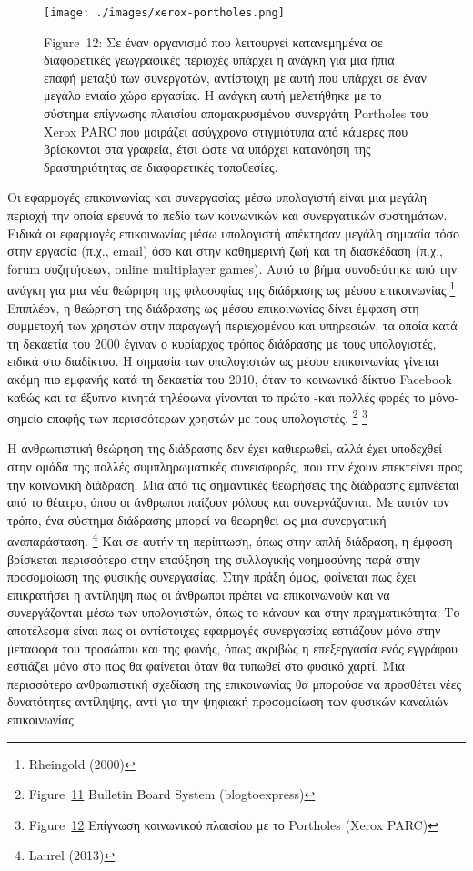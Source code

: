 \documentclass[
]{article}
\begin{document}
\leavevmode{}%
\begin{figure}
\hypertarget{fig:xerox-portholes}{%
\centering
\texttt{[image: ./images/xerox-portholes.png]}
\caption{Figure~12: Σε έναν οργανισμό που λειτουργεί κατανεμημένα σε
διαφορετικές γεωγραφικές περιοχές υπάρχει η ανάγκη για μια ήπια επαφή
μεταξύ των συνεργατών, αντίστοιχη με αυτή που υπάρχει σε έναν μεγάλο
ενιαίο χώρο εργασίας. Η ανάγκη αυτή μελετήθηκε με το σύστημα επίγνωσης
πλαισίου απομακρυσμένου συνεργάτη Portholes του Xerox PARC που μοιράζει
ασύγχρονα στιγμιότυπα από κάμερες που βρίσκονται στα γραφεία, έτσι ώστε
να υπάρχει κατανόηση της δραστηριότητας σε διαφορετικές
τοποθεσίες.}\label{fig:xerox-portholes}
}
\end{figure}

Οι εφαρμογές επικοινωνίας και συνεργασίας μέσω υπολογιστή είναι μια
μεγάλη περιοχή την οποία ερευνά το πεδίο των κοινωνικών και συνεργατικών
συστημάτων. Ειδικά οι εφαρμογές επικοινωνίας μέσω υπολογιστή απέκτησαν
μεγάλη σημασία τόσο στην εργασία (π.χ., email) όσο και στην καθημερινή
ζωή και τη διασκέδαση (π.χ., forum συζητήσεων, online multiplayer
games). Αυτό το βήμα συνοδεύτηκε από την ανάγκη για μια νέα θεώρηση της
φιλοσοφίας της διάδρασης ως μέσου επικοινωνίας.\footnote{Rheingold
  (2000)} Επιπλέον, η θεώρηση της διάδρασης ως μέσου επικοινωνίας δίνει
έμφαση στη συμμετοχή των χρηστών στην παραγωγή περιεχομένου και
υπηρεσιών, τα οποία κατά τη δεκαετία του 2000 έγιναν ο κυρίαρχος τρόπος
διάδρασης με τους υπολογιστές, ειδικά στο διαδίκτυο. Η σημασία των
υπολογιστών ως μέσου επικοινωνίας γίνεται ακόμη πιο εμφανής κατά τη
δεκαετία του 2010, όταν το κοινωνικό δίκτυο Facebook καθώς και τα έξυπνα
κινητά τηλέφωνα γίνονται το πρώτο -και πολλές φορές το μόνο- σημείο
επαφής των περισσότερων χρηστών με τους υπολογιστές. \footnote{Figure~\protect\hyperlink{fig:bbs}{11}
  Bulletin Board System (blogtoexpress)} \footnote{Figure~\protect\hyperlink{fig:xerox-portholes}{12}
  Επίγνωση κοινωνικού πλαισίου με το Portholes (Xerox PARC)}

Η ανθρωπιστική θεώρηση της διάδρασης δεν έχει καθιερωθεί, αλλά έχει
υποδεχθεί στην ομάδα της πολλές συμπληρωματικές συνεισφορές, που την
έχουν επεκτείνει προς την κοινωνική διάδραση. Μια από τις σημαντικές
θεωρήσεις της διάδρασης εμπνέεται από το θέατρο, όπου οι άνθρωποι
παίζουν ρόλους και συνεργάζονται. Με αυτόν τον τρόπο, ένα σύστημα
διάδρασης μπορεί να θεωρηθεί ως μια συνεργατική αναπαράσταση.
\footnote{Laurel (2013)} Και σε αυτήν τη περίπτωση, όπως στην απλή
διάδραση, η έμφαση βρίσκεται περισσότερο στην επαύξηση της συλλογικής
νοημοσύνης παρά στην προσομοίωση της φυσικής συνεργασίας. Στην πράξη
όμως, φαίνεται πως έχει επικρατήσει η αντίληψη πως οι άνθρωποι πρέπει να
επικοινωνούν και να συνεργάζονται μέσω των υπολογιστών, όπως το κάνουν
και στην πραγματικότητα. Το αποτέλεσμα είναι πως οι αντίστοιχες
εφαρμογές συνεργασίας εστιάζουν μόνο στην μεταφορά του προσώπου και της
φωνής, όπως ακριβώς η επεξεργασία ενός εγγράφου εστιάζει μόνο στο πως θα
φαίνεται όταν θα τυπωθεί στο φυσικό χαρτί. Μια περισσότερο ανθρωπιστική
σχεδίαση της επικοινωνίας θα μπορούσε να προσθέτει νέες δυνατότητες
αντίληψης, αντί για την ψηφιακή προσομοίωση των φυσικών καναλιών
επικοινωνίας.
\end{document}
